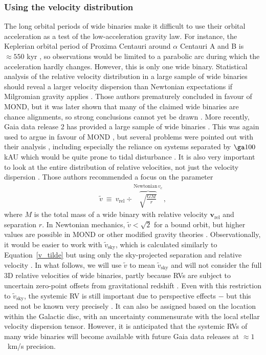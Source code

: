 \documentclass[fleqn,usenatbib,useAMS]{mnras} %
\begin{document}
\subsubsection{Using the velocity distribution}
\label{Wide_binaries_using_v}

The long orbital periods of wide binaries make it difficult to use their orbital acceleration as a test of the low-acceleration gravity law. For instance, the Keplerian orbital period of Proxima Centauri around $\alpha$ Centauri A and B is $\approx 550$ kyr \citep{Kervella_2017}, so observations would be limited to a parabolic arc during which the acceleration hardly changes. However, this is only one wide binary. Statistical analysis of the relative velocity distribution in a large sample of wide binaries should reveal a larger velocity dispersion than Newtonian expectations if Milgromian gravity applies \citep{Hernandez_2012}. Those authors prematurely concluded in favour of MOND, but it was later shown that many of the claimed wide binaries are chance alignments, so strong conclusions cannot yet be drawn \citep{Scarpa_2017}. More recently, Gaia data release 2 \citep{Gaia_2018} has provided a large sample of wide binaries \citep[e.g.][]{Andrews_2017}. This was again used to argue in favour of MOND \citep{Hernandez_2018}, but several problems were pointed out with their analysis \citep{Badry_2019, Banik_2019_line}, including especially the reliance on systems separated by $\ga 100$ kAU which would be quite prone to tidal disturbance \citep{Jiang_2010}. It is also very important to look at the entire distribution of relative velocities, not just the velocity dispersion \citep{Pittordis_2018}. Those authors recommended a focus on the parameter
\begin{eqnarray}
	\widetilde{v} ~\equiv~ v_\text{rel} \div \overbrace{\sqrt{\frac{GM}{r}}}^{\text{Newtonian} \,  v_c} \, ,
	\label{v_tilde}
\end{eqnarray}
where $M$ is the total mass of a wide binary with relative velocity $\bm{v}_\text{rel}$ and separation $r$. In Newtonian mechanics, $\widetilde{v} < \sqrt{2}$ for a bound orbit, but higher values are possible in MOND or other modified gravity theories \citep{Pittordis_2018}. Observationally, it would be easier to work with $\widetilde{v}_{\text{sky}}$, which is calculated similarly to Equation~\ref{v_tilde} but using only the sky-projected separation and relative velocity \citep{Banik_2018_Centauri}. In what follows, we will use $\widetilde{v}$ to mean $\widetilde{v}_{\text{sky}}$ and will not consider the full 3D relative velocities of wide binaries, partly because RVs are subject to uncertain zero-point offsets from gravitational redshift \citep{Loeb_2022}. Even with this restriction to $\widetilde{v}_{\text{sky}}$, the systemic RV is still important due to perspective effects \citep{Badry_2019} $-$ but this need not be known very precisely \citep{Banik_2019_line}. It can also be assigned based on the location within the Galactic disc, with an uncertainty commensurate with the local stellar velocity dispersion tensor. However, it is anticipated that the systemic RVs of many wide binaries will become available with future Gaia data releases at $\approx 1$~km/s precision.
\end{document}
